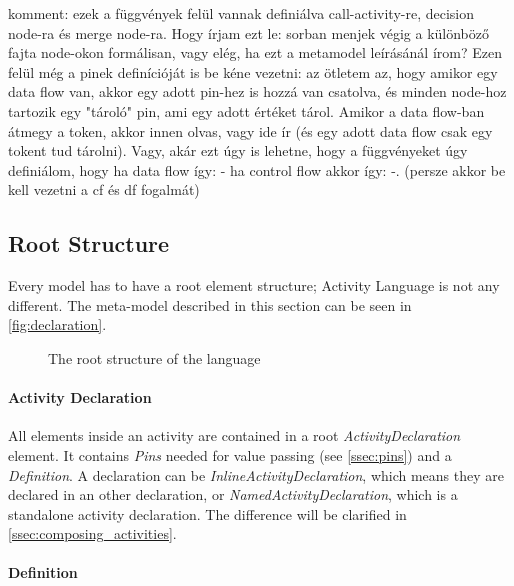 komment: ezek a függvények felül vannak definiálva call-activity-re, decision node-ra és merge node-ra. Hogy írjam ezt le: sorban menjek végig a különböző fajta node-okon formálisan, vagy elég, ha ezt a metamodel leírásánál írom? Ezen felül még a pinek definícióját is be kéne vezetni: az ötletem az, hogy amikor egy data flow van, akkor egy adott pin-hez is hozzá van csatolva, és minden node-hoz tartozik egy "tároló" pin, ami egy adott értéket tárol. Amikor a data flow-ban átmegy a token, akkor innen olvas, vagy ide ír (és egy adott data flow csak egy tokent tud tárolni). Vagy, akár ezt úgy is lehetne, hogy a függvényeket úgy definiálom, hogy ha data flow így: - ha control flow akkor így: -. (persze akkor be kell vezetni a cf és df fogalmát)

\subsection{Root Structure}\label{ssec:root_structure}

Every model has to have a root element structure; Activity Language is not any different. The meta-model described in this section can be seen in \autoref{fig:declaration}.

\begin{figure}[!ht]
	\centering
	
	\caption{The root structure of the language}
	\label{fig:declaration}
\end{figure}

\paragraph{Activity Declaration}\label{par:activity_declaration}

All elements inside an activity are contained in a root \emph{ActivityDeclaration} element. It contains \emph{Pins} needed for value passing (see \autoref{ssec:pins}) and a \emph{Definition}. A declaration can be \emph{InlineActivityDeclaration}, which means they are declared in an other declaration, or \emph{NamedActivityDeclaration}, which is a standalone activity declaration. The difference will be clarified in \autoref{ssec:composing_activities}.

\paragraph{Definition}\label{par:definition}

